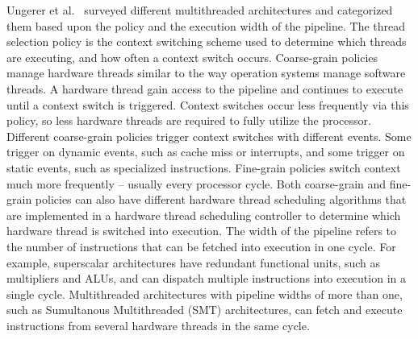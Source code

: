Ungerer et al.~\cite{Ungerer:2003:survey_multithreading} surveyed different multithreaded architectures and categorized them based upon the  policy and the execution width of the pipeline.
The thread selection policy is the context switching scheme used to determine which threads are executing, and how often a context switch occurs.  
Coarse-grain policies manage hardware threads similar to the way operation systems manage software threads.
A hardware thread gain access to the pipeline and continues to execute until a context switch is triggered.
Context switches occur less frequently via this policy, so less hardware threads are required to fully utilize the processor.
Different coarse-grain policies trigger context switches with different events. 
Some trigger on dynamic events, such as cache miss or interrupts, and some trigger on static events, such as specialized instructions.
Fine-grain policies switch context much more frequently -- usually every processor cycle.
Both coarse-grain and fine-grain policies can also have different hardware thread scheduling algorithms that are implemented in a hardware thread scheduling controller to determine which hardware thread is switched into execution.  
The width of the pipeline refers to the number of instructions that can be fetched into execution in one cycle. 
For example, superscalar architectures have redundant functional units, such as multipliers and ALUs, and can dispatch multiple instructions into execution in a single cycle. 
Multithreaded architectures with pipeline widths of more than one, such as Sumultanous Multithreaded (SMT) architectures, can fetch and execute instructions from several hardware threads in the same cycle.

